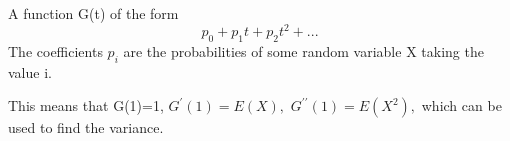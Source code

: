 A function G(t) of the form $$p_{0}+p_{1}t+p_{2}t^{2}+...$$    The coefficients $p_{i}$  are the probabilities of
some random variable X taking the value i.
\par
This means that G(1)=1, $ G^{\prime} (1) = E(X) , $
$ G^{ \prime \prime } (1) = E(X^2) , $ which can be used to find the
variance.
